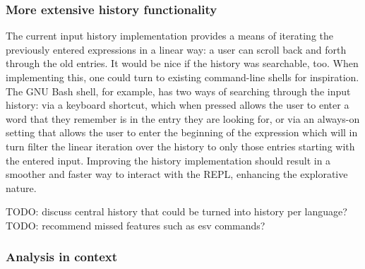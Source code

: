 \subsubsection{More extensive history functionality}

The current input history implementation provides a means of iterating the
previously entered expressions in a linear way: a user can scroll back and forth
through the old entries. It would be nice if the history was searchable, too.
When implementing this, one could turn to existing command-line shells for
inspiration. The GNU Bash shell, for example, has two ways of searching through
the input history: via a keyboard shortcut, which when pressed allows the user
to enter a word that they remember is in the entry they are looking for, or via
an always-on setting that allows the user to enter the beginning of the
expression which will in turn filter the linear iteration over the history to
only those entries starting with the entered input.
Improving the history implementation should result in a smoother and faster way
to interact with the REPL, enhancing the explorative nature.

TODO: discuss central history that could be turned into history per language?
TODO: recommend missed features such as esv commands?

\subsubsection{Analysis in context}

